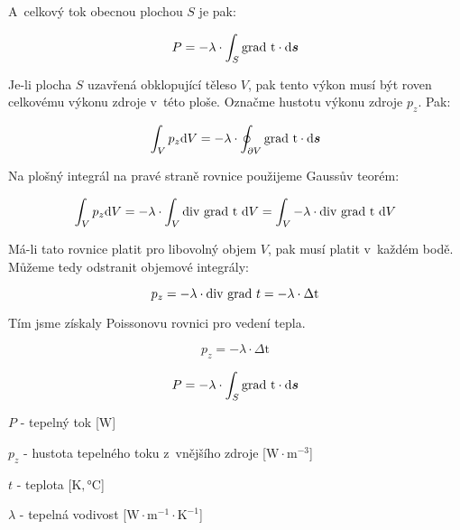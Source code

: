 A~celkový tok obecnou plochou \(S\) je pak:

\begin{equation}
P = -\lambda \cdot \int_{S} \grad \ \mathrm{t} \cdot \mathrm{d}\vect{s} 
\end{equation}

Je-li plocha \(S\) uzavřená obklopující těleso \(V\), pak tento výkon musí být roven celkovému výkonu zdroje v~této ploše. Označme hustotu výkonu zdroje \(p_z\). Pak:

\begin{equation}
\int_{V} p_z \mathrm{d}V = -\lambda \cdot \oint_{\partial V} \mathrm{grad} \ \mathrm{t} \cdot \mathrm{d}\boldsymbol{s} 
\end{equation} 

Na plošný integrál na pravé straně rovnice použijeme Gaussův teorém: 

\begin{equation}
\int_{V} p_z \mathrm{d}V = -\lambda \cdot \int_{V} \mathrm{div} \ \mathrm{grad} \ \mathrm{t} \ \mathrm{d}V = \int_{V} -\lambda \cdot \mathrm{div} \ \mathrm{grad} \ \mathrm{t} \ \mathrm{d}V
\end{equation}

Má-li tato rovnice platit pro libovolný objem \(V\), pak musí platit v~každém bodě. Můžeme tedy odstranit objemové integrály:

\begin{equation}
p_z = -\lambda \cdot \mathrm{div} \ \mathrm{grad} \ t = -\lambda \cdot \Delta \mathrm{t}
\end{equation}

Tím jsme získaly Poissonovu rovnici pro vedení tepla.

\begin{fact}

\begin{equation}
p_z = -\lambda \cdot \Delta \mathrm{t}
\end{equation}

\begin{equation}
P = -\lambda \cdot \int_{S} \grad \ \mathrm{t} \cdot \mathrm{d}\vect{s} 
\end{equation}

\(P\) - tepelný tok [\(\mathrm{W}\)]

\(p_z\) - hustota tepelného toku z~vnějšího zdroje [\(\mathrm{W} \cdot \mathrm{m}^{-3}\)]

\(t\) - teplota [\(\mathrm{K}, \si{\degree}\mathrm{C}\)]

\(\lambda\) - tepelná vodivost [\(\mathrm{W} \cdot \mathrm{m}^{-1} \cdot \mathrm{K}^{-1}\)] 
\end{fact}

